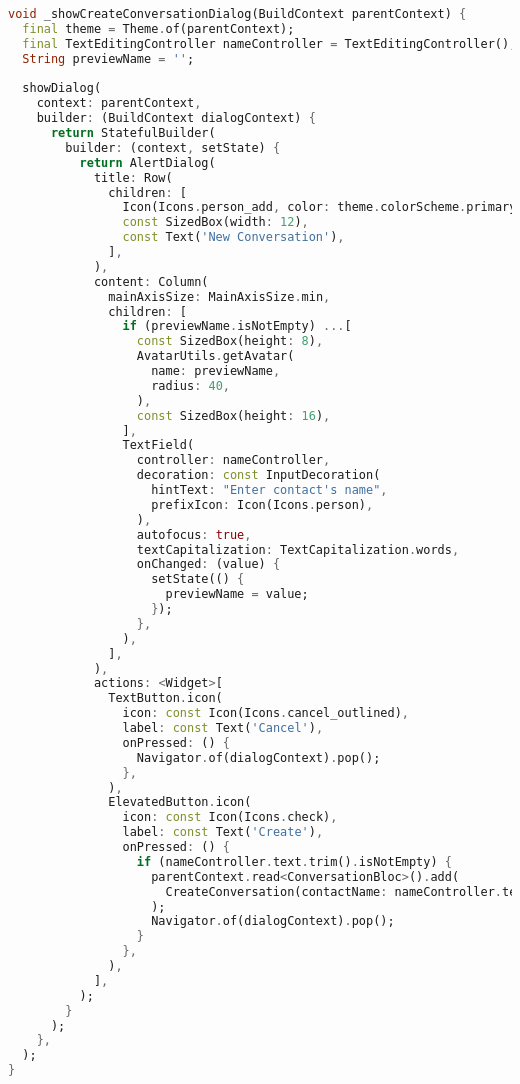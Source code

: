 \begin{lstlisting}[language=Dart, caption=Dialogue de création d'une nouvelle conversation, style=dartstyle]
void _showCreateConversationDialog(BuildContext parentContext) {
  final theme = Theme.of(parentContext);
  final TextEditingController nameController = TextEditingController();
  String previewName = '';
  
  showDialog(
    context: parentContext,
    builder: (BuildContext dialogContext) {
      return StatefulBuilder(
        builder: (context, setState) {
          return AlertDialog(
            title: Row(
              children: [
                Icon(Icons.person_add, color: theme.colorScheme.primary),
                const SizedBox(width: 12),
                const Text('New Conversation'),
              ],
            ),
            content: Column(
              mainAxisSize: MainAxisSize.min,
              children: [
                if (previewName.isNotEmpty) ...[
                  const SizedBox(height: 8),
                  AvatarUtils.getAvatar(
                    name: previewName,
                    radius: 40,
                  ),
                  const SizedBox(height: 16),
                ],
                TextField(
                  controller: nameController,
                  decoration: const InputDecoration(
                    hintText: "Enter contact's name",
                    prefixIcon: Icon(Icons.person),
                  ),
                  autofocus: true,
                  textCapitalization: TextCapitalization.words,
                  onChanged: (value) {
                    setState(() {
                      previewName = value;
                    });
                  },
                ),
              ],
            ),
            actions: <Widget>[
              TextButton.icon(
                icon: const Icon(Icons.cancel_outlined),
                label: const Text('Cancel'),
                onPressed: () {
                  Navigator.of(dialogContext).pop();
                },
              ),
              ElevatedButton.icon(
                icon: const Icon(Icons.check),
                label: const Text('Create'),
                onPressed: () {
                  if (nameController.text.trim().isNotEmpty) {
                    parentContext.read<ConversationBloc>().add(
                      CreateConversation(contactName: nameController.text.trim())
                    );
                    Navigator.of(dialogContext).pop();
                  }
                },
              ),
            ],
          );
        }
      );
    },
  );
}
\end{lstlisting}
